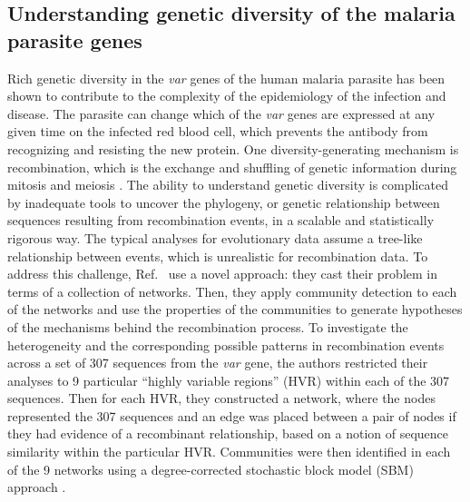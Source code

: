 \subsection{Understanding genetic diversity of the malaria parasite genes}
\indent Rich genetic diversity in the  \emph{var} genes of the human malaria parasite has been shown to contribute to the complexity of the epidemiology of the infection and disease. The parasite can change which of the  \emph{var} genes are expressed at any given time on the infected red blood cell, which prevents the antibody from recognizing and resisting the new protein. One diversity-generating mechanism is recombination, which is the exchange and shuffling of genetic information during mitosis and meiosis \cite{varIntro}. The ability to understand genetic diversity is complicated by inadequate tools to uncover the phylogeny, or genetic relationship between sequences resulting from recombination events, in a scalable and statistically rigorous way. The typical analyses for evolutionary data assume a tree-like relationship between events, which is unrealistic for recombination data. To address this challenge, Ref.~\cite{larremoreparasite} use a novel approach: they cast their problem in terms of a collection of networks. Then, they apply community detection to each of the networks and use the properties of the communities to generate hypotheses of the mechanisms behind the recombination process. To investigate the heterogeneity and the corresponding possible patterns in recombination events across a set of 307 sequences from the \emph{var} gene, the authors restricted their analyses to 9 particular ``highly variable regions'' (HVR) within each of the 307 sequences. Then for each HVR, they constructed a network, where the nodes represented the 307 sequences and an edge was placed between a pair of nodes if they had evidence of a recombinant relationship, based on a notion of sequence similarity within the particular HVR. Communities were then identified in each of the 9 networks using a degree-corrected stochastic block model (SBM) approach \cite{degreeCorrect}.\\

